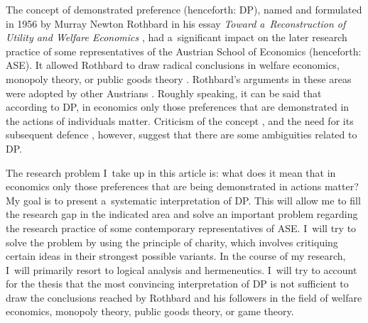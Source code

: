 The concept of demonstrated preference (henceforth: DP), named and formulated in 1956 by Murray Newton Rothbard in his essay \textit{Toward a~Reconstruction of Utility and Welfare Economics} 
\parencite[][]{rothbard_present_2011}, %
 had a~significant impact on the later research practice of some representatives of the Austrian School of Economics (henceforth: ASE). It allowed Rothbard to draw radical conclusions in welfare economics, monopoly theory, or public goods theory 
\parencites[cf.][]{rothbard_man_2009}[][]{rothbard_power_2009}[][]{rothbard_present_2011}. %
 Rothbard's arguments in these areas were adopted by other Austrians 
\parencites[e.g.,][]{block_public_1983}[][]{herbener_defense_2008}[][]{hoppe_theory_1989}[][]{hoppe_economics_2006}[][]{wisniewski_economics_2018}. %
 Roughly speaking, it can be said that according to DP, in economics only those preferences that are demonstrated in the actions of individuals matter. Criticism of the concept 
\parencites[e.g.][]{nozick_austrian_1977}[][]{caplan_austrian_1999}[][]{kvasnicka_rothbards_2008}, %
 and the need for its subsequent defence 
\parencites[e.g.,][]{block_austrian_1999}[][]{wysocki_rothbards_2019}[][]{gordon_misunderstanding_2022}, %
 however, suggest that there are some ambiguities related to DP.



The research problem I~take up in this article is: what does it mean that in economics only those preferences that are being demonstrated in actions matter? My goal is to present a~systematic interpretation of DP. This will allow me to fill the research gap in the indicated area and solve an important problem regarding the research practice of some contemporary representatives of ASE. I~will try to solve the problem by using the principle of charity, which involves critiquing certain ideas in their strongest possible variants. In the course of my research, I~will primarily resort to logical analysis and hermeneutics. I~will try to account for the thesis that the most convincing interpretation of DP is not sufficient to draw the conclusions reached by Rothbard and his followers in the field of welfare economics, monopoly theory, public goods theory, or game theory.



